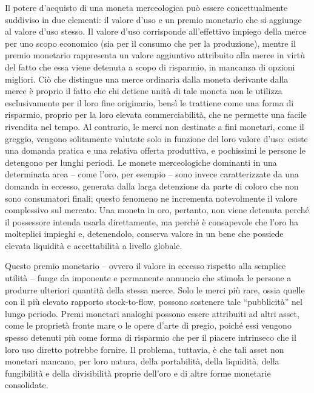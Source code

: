 \documentclass[
  a5paper,
  smalldemyvopaper,10pt,twoside,onecolumn,openright,extrafontsizes,hidelinks]{memoir}
\begin{document}
Il potere d'acquisto di una moneta merceologica può essere
concettualmente suddiviso in due elementi: il valore d'uso e un premio
monetario che si aggiunge al valore d'uso stesso. Il valore d'uso
corrisponde all'effettivo impiego della merce per uno scopo economico
(sia per il consumo che per la produzione), mentre il premio monetario
rappresenta un valore aggiuntivo attribuito alla merce in virtù del
fatto che essa viene detenuta a scopo di risparmio, in mancanza di
opzioni migliori. Ciò che distingue una merce ordinaria dalla moneta
derivante dalla merce è proprio il fatto che chi detiene unità di tale
moneta non le utilizza esclusivamente per il loro fine originario, bensì
le trattiene come una forma di risparmio, proprio per la loro elevata
commerciabilità, che ne permette una facile rivendita nel tempo. Al
contrario, le merci non destinate a fini monetari, come il greggio,
vengono solitamente valutate solo in funzione del loro valore d'uso:
esiste una domanda pratica e una relativa offerta produttiva, e
pochissimi le persone le detengono per lunghi periodi. Le monete
merceologiche dominanti in una determinata area -- come l'oro, per
esempio -- sono invece caratterizzate da una domanda in eccesso,
generata dalla larga detenzione da parte di coloro che non sono
consumatori finali; questo fenomeno ne incrementa notevolmente il valore
complessivo sul mercato. Una moneta in oro, pertanto, non viene detenuta
perché il possessore intenda usarla direttamente, ma perché è
consapevole che l'oro ha molteplici impieghi e, detenendolo, conserva
valore in un bene che possiede elevata liquidità e accettabilità a
livello globale.

Questo premio monetario -- ovvero il valore in eccesso rispetto alla
semplice utilità -- funge da imponente e permanente annuncio che stimola
le persone a produrre ulteriori quantità della stessa merce. Solo le
merci più rare, ossia quelle con il più elevato rapporto stock-to-flow,
possono sostenere tale ``pubblicità'' nel lungo periodo. Premi monetari
analoghi possono essere attribuiti ad altri asset, come le proprietà
fronte mare o le opere d'arte di pregio, poiché essi vengono spesso
detenuti più come forma di risparmio che per il piacere intrinseco che
il loro uso diretto potrebbe fornire. Il problema, tuttavia, è che tali
asset non monetari mancano, per loro natura, della portabilità, della
liquidità, della fungibilità e della divisibilità proprie dell'oro e di
altre forme monetarie consolidate.
\end{document}
